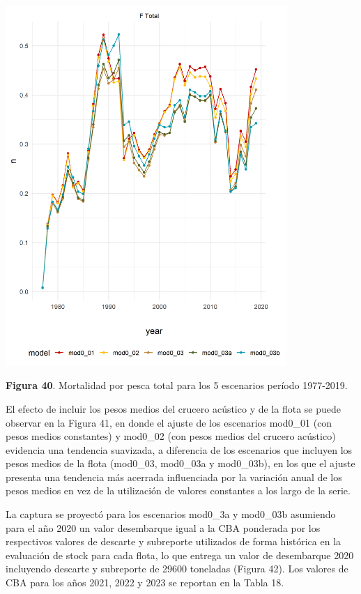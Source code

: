 \documentclass[
  spanish,
]{article}
\begin{document}
\begin{center}
\includegraphics[width=0.8\textwidth]{Figuras/Figura_40.png}
\end{center}

\small \textbf{Figura 40}. Mortalidad por pesca total para los 5
escenarios período 1977-2019. \vspace{0.5cm} \normalsize

El efecto de incluir los pesos medios del crucero acústico y de la flota
se puede observar en la Figura 41, en donde el ajuste de los escenarios
mod0\_01 (con pesos medios constantes) y mod0\_02 (con pesos medios del
crucero acústico) evidencia una tendencia suavizada, a diferencia de los
escenarios que incluyen los pesos medios de la flota (mod0\_03,
mod0\_03a y mod0\_03b), en los que el ajuste presenta una tendencia más
acerrada influenciada por la variación anual de los pesos medios en vez
de la utilización de valores constantes a los largo de la serie.

La captura se proyectó para los escenarios mod0\_3a y mod0\_03b
asumiendo para el año 2020 un valor desembarque igual a la CBA ponderada
por los respectivos valores de descarte y subreporte utilizados de forma
histórica en la evaluación de stock para cada flota, lo que entrega un
valor de desembarque 2020 incluyendo descarte y subreporte de 29600
toneladas (Figura 42). Los valores de CBA para los años 2021, 2022 y
2023 se reportan en la Tabla 18.
\end{document}
